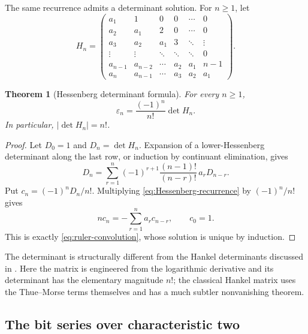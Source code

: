 \documentclass[11pt,oneside]{article}
\newtheorem{theorem}{Theorem}[section]
\theoremstyle{definition}
\theoremstyle{remark}
\newcommand{\eps}{\varepsilon}
\begin{document}
The same recurrence admits a determinant solution.  For \(n\ge1\), let
\begin{equation}
 H_n=\begin{pmatrix}
 a_1&1&0&0&\cdots&0\\
 a_2&a_1&2&0&\cdots&0\\
 a_3&a_2&a_1&3&\ddots&\vdots\\
 \vdots&\vdots&\ddots&\ddots&\ddots&0\\
 a_{n-1}&a_{n-2}&\cdots&a_2&a_1&n-1\\
 a_n&a_{n-1}&\cdots&a_3&a_2&a_1
 \end{pmatrix}.                                            \label{eq:Hn-matrix}
\end{equation}

\begin{theorem}[Hessenberg determinant formula]
\label{thm:Hessenberg-determinant}
For every \(n\ge1\),
\begin{equation}
  \boxed{
  \eps_n=\frac{(-1)^n}{n!}\det H_n.}                       \label{eq:Hessenberg-determinant}
\end{equation}
In particular, \(|\det H_n|=n!\).
\end{theorem}

\begin{proof}
Let \(D_0=1\) and \(D_n=\det H_n\).  Expansion of a lower-Hessenberg determinant along the
last row, or induction by continuant elimination, gives
\begin{equation}
  D_n=\sum_{r=1}^{n}(-1)^{r+1}
      \frac{(n-1)!}{(n-r)!}\,a_rD_{n-r}.                    \label{eq:Hessenberg-recurrence}
\end{equation}
Put \(c_n=(-1)^nD_n/n!\).  Multiplying \eqref{eq:Hessenberg-recurrence} by
\((-1)^n/n!\) gives
\[
  nc_n=-\sum_{r=1}^{n}a_rc_{n-r},\qquad c_0=1.
\]
This is exactly \eqref{eq:ruler-convolution}, whose solution is unique by induction.
\end{proof}

The determinant is structurally different from the Hankel determinants discussed in
.  Here the matrix is engineered from the logarithmic derivative and its
determinant has the elementary magnitude \(n!\); the classical Hankel matrix uses the
Thue--Morse terms themselves and has a much subtler nonvanishing theorem.

\subsection{The bit series over characteristic two}
\end{document}
